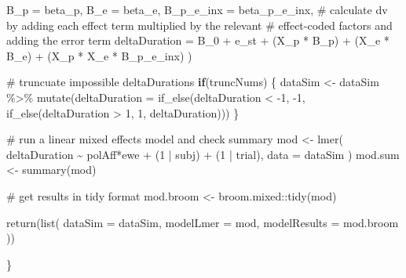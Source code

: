 \documentclass[
  letterpaper,
  DIV=11,
  numbers=noendperiod]{scrartcl}
\newenvironment{Shaded}{\begin{snugshade}}{\end{snugshade}}
\newcommand{\AttributeTok}[1]{\textcolor[rgb]{0.40,0.45,0.13}{#1}}
\newcommand{\CommentTok}[1]{\textcolor[rgb]{0.37,0.37,0.37}{#1}}
\newcommand{\ControlFlowTok}[1]{\textcolor[rgb]{0.00,0.23,0.31}{\textbf{#1}}}
\newcommand{\DecValTok}[1]{\textcolor[rgb]{0.68,0.00,0.00}{#1}}
\newcommand{\FunctionTok}[1]{\textcolor[rgb]{0.28,0.35,0.67}{#1}}
\newcommand{\NormalTok}[1]{\textcolor[rgb]{0.00,0.23,0.31}{#1}}
\newcommand{\OtherTok}[1]{\textcolor[rgb]{0.00,0.23,0.31}{#1}}
\newcommand{\SpecialCharTok}[1]{\textcolor[rgb]{0.37,0.37,0.37}{#1}}
\begin{document}
\begin{Shaded}
\begin{Highlighting}[]
      \AttributeTok{B\_p =}\NormalTok{ beta\_p,}
      \AttributeTok{B\_e =}\NormalTok{ beta\_e,}
      \AttributeTok{B\_p\_e\_inx =}\NormalTok{ beta\_p\_e\_inx,}
      \CommentTok{\# calculate dv by adding each effect term multiplied by the relevant}
      \CommentTok{\# effect{-}coded factors and adding the error term}
      \AttributeTok{deltaDuration =} 
\NormalTok{        B\_0 }\SpecialCharTok{+}\NormalTok{ e\_st }\SpecialCharTok{+}
\NormalTok{        (X\_p }\SpecialCharTok{*}\NormalTok{ B\_p) }\SpecialCharTok{+}
\NormalTok{        (X\_e }\SpecialCharTok{*}\NormalTok{ B\_e) }\SpecialCharTok{+}
\NormalTok{        (X\_p }\SpecialCharTok{*}\NormalTok{ X\_e }\SpecialCharTok{*}\NormalTok{ B\_p\_e\_inx)}
\NormalTok{    )}
  
  \CommentTok{\# truncuate impossible deltaDurations}
  \ControlFlowTok{if}\NormalTok{(truncNums) \{}
\NormalTok{    dataSim }\OtherTok{\textless{}{-}}\NormalTok{ dataSim }\SpecialCharTok{\%\textgreater{}\%} 
      \FunctionTok{mutate}\NormalTok{(}\AttributeTok{deltaDuration =} \FunctionTok{if\_else}\NormalTok{(deltaDuration }\SpecialCharTok{\textless{}} \SpecialCharTok{{-}}\DecValTok{1}\NormalTok{, }\SpecialCharTok{{-}}\DecValTok{1}\NormalTok{,}
        \FunctionTok{if\_else}\NormalTok{(deltaDuration }\SpecialCharTok{\textgreater{}} \DecValTok{1}\NormalTok{, }\DecValTok{1}\NormalTok{, deltaDuration)))}
\NormalTok{  \}}
  
  \CommentTok{\# run a linear mixed effects model and check summary}
\NormalTok{  mod }\OtherTok{\textless{}{-}} \FunctionTok{lmer}\NormalTok{(}
\NormalTok{    deltaDuration }\SpecialCharTok{\textasciitilde{}}\NormalTok{ polAff}\SpecialCharTok{*}\NormalTok{ewe }\SpecialCharTok{+}\NormalTok{ (}\DecValTok{1} \SpecialCharTok{|}\NormalTok{ subj) }\SpecialCharTok{+}\NormalTok{ (}\DecValTok{1} \SpecialCharTok{|}\NormalTok{ trial),}
    \AttributeTok{data =}\NormalTok{ dataSim}
\NormalTok{  )}
\NormalTok{  mod.sum }\OtherTok{\textless{}{-}} \FunctionTok{summary}\NormalTok{(mod)}
  
  \CommentTok{\# get results in tidy format}
\NormalTok{  mod.broom }\OtherTok{\textless{}{-}}\NormalTok{ broom.mixed}\SpecialCharTok{::}\FunctionTok{tidy}\NormalTok{(mod)}
  
  \FunctionTok{return}\NormalTok{(}\FunctionTok{list}\NormalTok{(}
    \AttributeTok{dataSim =}\NormalTok{ dataSim,}
    \AttributeTok{modelLmer =}\NormalTok{ mod,}
    \AttributeTok{modelResults =}\NormalTok{ mod.broom}
\NormalTok{  ))}
  
\NormalTok{\}}
\end{Highlighting}
\end{Shaded}
\end{document}
